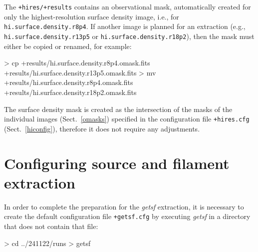 \documentclass[a4paper,10pt]{article}
\begin{document}
The \verb!+hires/+results! contains an observational mask, automatically created for only the highest-resolution surface density
image, i.e., for \verb!hi.surface.density.r8p4!. If another image is planned for an extraction (e.g.,
\verb!hi.surface.density.r13p5! or \verb!hi.surface.density.r18p2!), then the mask must either be copied or renamed, for example:
\begin{verbnobox}[\mbox{}\small]
> cp +results/hi.surface.density.r8p4.omask.fits +results/hi.surface.density.r13p5.omask.fits
> mv +results/hi.surface.density.r8p4.omask.fits +results/hi.surface.density.r18p2.omask.fits
\end{verbnobox}
The surface density mask is created as the intersection of the masks of the individual images (Sect.~\ref{omasks}) specified in the
configuration file \verb!+hires.cfg! (Sect.~\ref{hiconfig}), therefore it does not require any adjustments.


\section{Configuring source and filament extraction}
\label{editconfig}

In order to complete the preparation for the \textsl{getsf} extraction, it is necessary to create the default configuration file
\verb!+getsf.cfg! by executing \textsl{getsf} in a directory that does not contain that file:
\begin{verbnobox}[\mbox{}\small]
> cd ../241122/runs
> getsf
\end{verbnobox}

\end{document}
